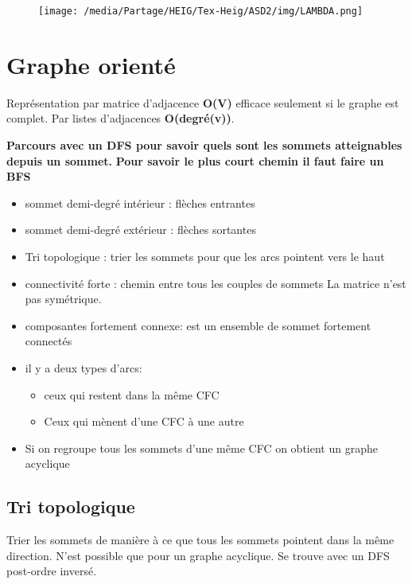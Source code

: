 \documentclass[
]{article}
\begin{document}
\begin{figure}
\centering
\texttt{[image: /media/Partage/HEIG/Tex-Heig/ASD2/img/LAMBDA.png]}
\caption{}
\end{figure}

\hypertarget{header-n25}{%
\section{Graphe orienté}\label{header-n25}}

Représentation par matrice d'adjacence \textbf{O(V)} efficace seulement
si le graphe est complet. Par listes d'adjacences \textbf{O(degré(v))}.

\textbf{Parcours avec un DFS pour savoir quels sont les sommets
atteignables depuis un sommet. } \textbf{Pour savoir le plus court
chemin il faut faire un BFS}

\begin{itemize}
\item
  sommet demi-degré intérieur : flèches entrantes
\item
  sommet demi-degré extérieur : flèches sortantes
\item
  Tri topologique : trier les sommets pour que les arcs pointent vers le
  haut 
\item
  connectivité forte : chemin entre tous les couples de sommets La
  matrice n'est pas symétrique. 
\item
  composantes fortement connexe: est un ensemble de sommet fortement
  connectés 
\item
  il y a deux types d'arcs:

  \begin{itemize}
  \item
    ceux qui restent dans la même CFC 
  \item
    Ceux qui mènent d'une CFC à une autre 
  \end{itemize}
\item
  Si on regroupe tous les sommets d'une même CFC on obtient un graphe
  acyclique 
\end{itemize}

\hypertarget{header-n48}{%
\subsection{Tri topologique }\label{header-n48}}

Trier les sommets de manière à ce que tous les sommets pointent dans la
même direction. N'est possible que pour un graphe acyclique. Se trouve
avec un DFS post-ordre inversé.
\end{document}

